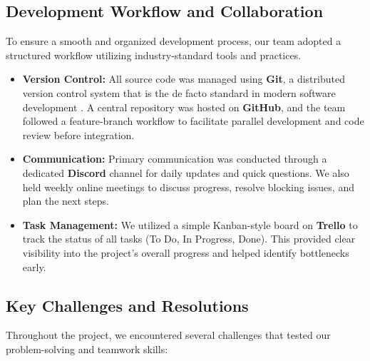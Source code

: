 \subsection{Development Workflow and Collaboration}
To ensure a smooth and organized development process, our team adopted a structured workflow utilizing industry-standard tools and practices.

\begin{itemize}
    \item \textbf{Version Control:} All source code was managed using \textbf{Git}, a distributed version control system that is the de facto standard in modern software development \cite{Chacon2014}. A central repository was hosted on \textbf{GitHub}, and the team followed a feature-branch workflow to facilitate parallel development and code review before integration.

    \item \textbf{Communication:} Primary communication was conducted through a dedicated \textbf{Discord} channel for daily updates and quick questions. We also held weekly online meetings to discuss progress, resolve blocking issues, and plan the next steps.

    \item \textbf{Task Management:} We utilized a simple Kanban-style board on \textbf{Trello} to track the status of all tasks (To Do, In Progress, Done). This provided clear visibility into the project's overall progress and helped identify bottlenecks early.
\end{itemize}

\subsection{Key Challenges and Resolutions}
Throughout the project, we encountered several challenges that tested our problem-solving and teamwork skills:

